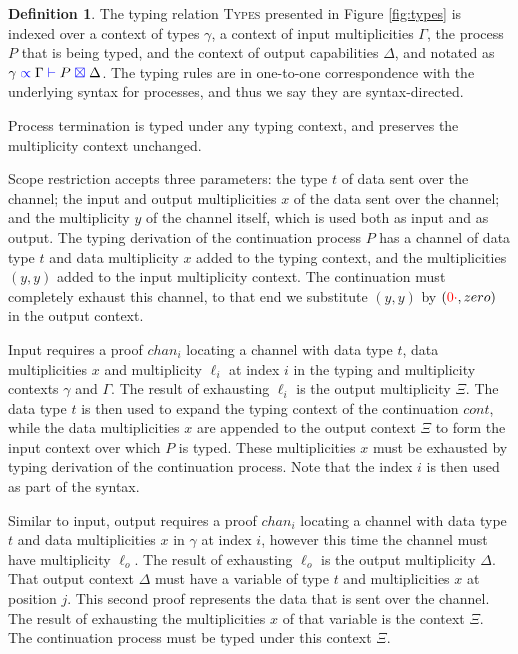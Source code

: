 \documentclass[a4paper,UKenglish,cleveref, autoref, thm-restate,authorcolumns]{lipics-v2019}
\theoremstyle{definition}
\newtheorem{nidefinition}[theorem]{Definition}
\newcommand{\type}[1]{\textcolor{blue}{\operatorname{#1}}}
\newcommand{\field}[1]{\textcolor{red}{\operatorname{#1}}}
\newcommand{\zero}{\field{0\cdot}}
\newcommand{\types}[4]{#1 \; \type{\propto} \; #2 \; \type{\vdash} \; #3 \; \type{\boxtimes} \; #4}
\begin{document}
\begin{nidefinition}
  The typing relation \textsc{Types} presented in Figure \ref{fig:types} is indexed over a context of types $\gamma$, a context of input multiplicities $\Gamma$, the process $P$ that is being typed, and the context of output capabilities $\Delta$, and notated as $\types{\gamma}{\Gamma}{P}{\Delta}$.
  The typing rules are in one-to-one correspondence with the underlying syntax for processes, and thus we say they are syntax-directed.

  Process termination is typed under any typing context, and preserves the multiplicity context unchanged.

  Scope restriction accepts three parameters: the type $t$ of data sent over the channel; the input and output multiplicities $x$ of the data sent over the channel; and the multiplicity $y$ of the channel itself, which is used both as input and as output.
  The typing derivation of the continuation process $P$ has a channel of data type $t$ and data multiplicity $x$ added to the typing context, and the multiplicities $(y , y)$ added to the input multiplicity context.
  The continuation must completely exhaust this channel, to that end we substitute $(y , y)$ by $(\zero , zero)$ in the output context.

  Input requires a proof $chan_i$ locating a channel with data type $t$, data multiplicities $x$ and multiplicity $\ell_i$ \todo{} at index $i$ in the typing and multiplicity contexts $\gamma$ and $\Gamma$.
  The result of exhausting $\ell_i$ is the output multiplicity $\Xi$.
  The data type $t$ is then used to expand the typing context of the continuation $cont$, while the data multiplicities $x$ are appended to the output context $\Xi$ to form the input context over which $P$ is typed.
  These multiplicities $x$ must be exhausted by typing derivation of the continuation process.
  Note that the index $i$ is then used as part of the syntax.


  Similar to input, output requires a proof $chan_i$ locating a channel with data type $t$ and data multiplicities $x$ in $\gamma$ at index $i$, however this time the channel must have multiplicity $\ell_o$.
  The result of exhausting $\ell_o$ is the output multiplicity $\Delta$.
  That output context $\Delta$ must have a variable of type $t$ and multiplicities $x$ at position $j$.
  This second proof represents the data that is sent over the channel.
  The result of exhausting the multiplicities $x$ of that variable is the context $\Xi$.
  The continuation process must be typed under this context $\Xi$.


\end{nidefinition}
\end{document}
